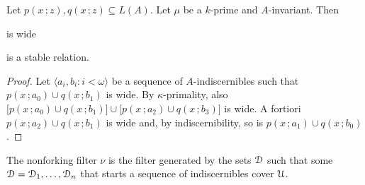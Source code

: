 \documentclass{amsproc}
\begin{document}
\begin{theorem}
  Let $p(x\,;z), q(x\,;z)\subseteq L(A)$.
  Let $\mu$ be a $k$-prime and $A$-invariant.
  Then 

   is wide

  is a stable relation.
\end{theorem}

\begin{proof}
  Let $\langle a_i,b_i: i<\omega\rangle$ be a sequence of $A$-indiscernibles such that $p(x\,;a_0)\cup q(x\,;b_1)$ is wide.
  By $\kappa$-primality, also $\big[p(x\,;a_0)\cup q(x\,;b_1)\big]\cup\big[p(x\,;a_2)\cup q(x\,;b_3)\big]$ is wide.
  A fortiori $p(x\,;a_2)\cup q(x\,;b_1)$ is wide and, by indiscernibility, so is $p(x\,;a_1)\cup q(x\,;b_0)$.
\end{proof}

\begin{definition}
  The nonforking filter $\nu$ is the filter generated by the sets $\EuScript D$ such that some $\EuScript D=\EuScript D_1,\dots,\EuScript D_n$ that starts a sequence of indiscernibles cover $\EuScript U$.
\end{definition}
\end{document}
